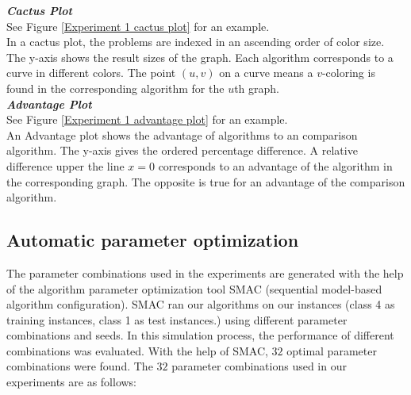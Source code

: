 \documentclass[12pt,a4paper,twoside]{scrartcl}
\numberwithin{equation}{section}
\begin{document}
\emph{\textbf{Cactus Plot}}\\
See Figure \ref{Experiment 1 cactus plot} for an example.\\
In a cactus plot, the problems are indexed in an ascending order of color size. The y-axis shows the result sizes of the graph. Each algorithm corresponds to a curve in different colors. The point $(u, v)$ on a curve means a $v$-coloring is found in the corresponding algorithm for the $u$th graph.\\
\emph{\textbf{Advantage Plot}}\\
See Figure \ref{Experiment 1 advantage plot} for an example.\\
An Advantage plot shows the advantage of algorithms to an comparison algorithm. The y-axis gives the ordered percentage difference. A relative difference  upper the line $x = 0$ corresponds to an advantage of the algorithm in the corresponding graph. The opposite is true for an advantage of the comparison algorithm.



 \subsection{Automatic parameter optimization}
The parameter combinations used in the experiments are generated with the help of the algorithm parameter optimization tool SMAC \cite{SMAC} (sequential model-based algorithm configuration). SMAC ran our algorithms on our instances (class 4 as training instances, class 1 as test instances.) using different parameter combinations and seeds. In this simulation process, the performance of different combinations was evaluated. With the help of SMAC, $32$ optimal parameter combinations were found. The $32$ parameter combinations used in our experiments are as follows:\\
\end{document}
